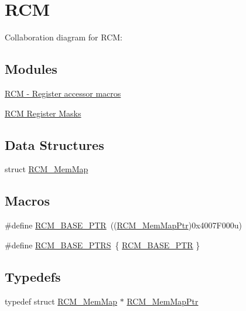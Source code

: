 \hypertarget{group___r_c_m___peripheral}{}\section{R\+CM}
\label{group___r_c_m___peripheral}
Collaboration diagram for R\+CM\+:
\subsection*{Modules}
\begin{DoxyCompactItemize}
\item 
\hyperlink{group___r_c_m___register___accessor___macros}{R\+C\+M -\/ Register accessor macros}
\item 
\hyperlink{group___r_c_m___register___masks}{R\+C\+M Register Masks}
\end{DoxyCompactItemize}
\subsection*{Data Structures}
\begin{DoxyCompactItemize}
\item 
struct \hyperlink{struct_r_c_m___mem_map}{R\+C\+M\+\_\+\+Mem\+Map}
\end{DoxyCompactItemize}
\subsection*{Macros}
\begin{DoxyCompactItemize}
\item 
\#define \hyperlink{group___r_c_m___peripheral_ga25ab3aa8d593d455ed36a52c77f88234}{R\+C\+M\+\_\+\+B\+A\+S\+E\+\_\+\+P\+TR}~((\hyperlink{group___r_c_m___peripheral_ga787b1c58d947f0b81c2502227dd0396b}{R\+C\+M\+\_\+\+Mem\+Map\+Ptr})0x4007\+F000u)
\item 
\#define \hyperlink{group___r_c_m___peripheral_gad8549fec4a09b0b485983beadfc3a5fb}{R\+C\+M\+\_\+\+B\+A\+S\+E\+\_\+\+P\+T\+RS}~\{ \hyperlink{group___r_c_m___peripheral_ga25ab3aa8d593d455ed36a52c77f88234}{R\+C\+M\+\_\+\+B\+A\+S\+E\+\_\+\+P\+TR} \}
\end{DoxyCompactItemize}
\subsection*{Typedefs}
\begin{DoxyCompactItemize}
\item 
typedef struct \hyperlink{struct_r_c_m___mem_map}{R\+C\+M\+\_\+\+Mem\+Map} $\ast$ \hyperlink{group___r_c_m___peripheral_ga787b1c58d947f0b81c2502227dd0396b}{R\+C\+M\+\_\+\+Mem\+Map\+Ptr}
\end{DoxyCompactItemize}


